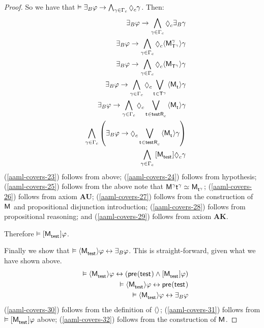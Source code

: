 \begin{proof}
So we have that $\entails \someactsBs \phi \implies \bigwedge_{\gamma \in \Gamma_\agentC} \possibleC \gamma$.
Then:
\begin{eqnarray}
    && \someactsBs \phi \implies \bigwedge_{\gamma \in \Gamma_\agentC} \possibleC \someactsBs \gamma \label{aaml-covers-23}\\
    && \someactsBs \phi \implies \bigwedge_{\gamma \in \Gamma_\agentC} \possibleC \actionE{\aPModel[\gamma]{\aStatesT[\gamma]}} \gamma \label{aaml-covers-24}\\
    && \someactsBs \phi \implies \bigwedge_{\gamma \in \Gamma_\agentC} \possibleC \actionE{\aPModel{\aStatesT[\gamma]}} \gamma \label{aaml-covers-25}\\
    && \someactsBs \phi \implies \bigwedge_{\gamma \in \Gamma_\agentC} \possibleC \bigvee_{\aStateT \in \aStatesT[\gamma]} \actionE{\aPModel{\aStateT}} \gamma \label{aaml-covers-26}\\
    && \someactsBs \phi \implies \bigwedge_{\gamma \in \Gamma_\agentC} \possibleC \bigvee_{\aStateT \in \aSuccessorsC{\aStateTest}} \actionE{\aPModel{\aStateT}} \gamma \label{aaml-covers-27}\\
    && \bigwedge_{\gamma \in \Gamma_\agentC} \left(\someactsBs \phi \implies \possibleC \bigvee_{\aStateT \in \aSuccessorsC{\aStateTest}} \actionE{\aPModel{\aStateT}} \gamma\right) \label{aaml-covers-28}\\
    && \bigwedge_{\gamma \in \Gamma_\agentC} \actionA{\aPModel{\aStateTest}} \possibleC \gamma \label{aaml-covers-29}
\end{eqnarray}
(\ref{aaml-covers-23}) follows from above;
(\ref{aaml-covers-24}) follows from hypothesis;
(\ref{aaml-covers-25}) follows from the above note that $\aModel[\gamma]{\aStateT[\gamma]} \bisimilar \aPModel{\aStateT[\gamma]}$;
(\ref{aaml-covers-26}) follows from \axiomAamlK{} axiom {\bf AU};
(\ref{aaml-covers-27}) follows from the construction of $\aModel$ and propositional disjunction introduction;
(\ref{aaml-covers-28}) follows from propositional reasoning; and
(\ref{aaml-covers-29}) follows from \axiomAamlK{} axiom {\bf AK}.

Therefore $\entails \actionA{\aPModel{\aStateTest}} \phi$.

Finally we show that $\entails \actionE{\aPModel{\aStateTest}} \phi \iff \someactsBs \phi$. 
This is straight-forward, given what we have shown above.
\begin{eqnarray}
    && \entails \actionE{\aPModel{\aStateTest}} \phi \iff (\aPrecondition(\aStateTest) \land \actionA{\aPModel{\aStateTest}} \phi) \label{aaml-covers-30}\\
    && \entails \actionE{\aPModel{\aStateTest}} \phi \iff \aPrecondition(\aStateTest) \label{aaml-covers-31}\\
    && \entails \actionE{\aPModel{\aStateTest}} \phi \iff \someactsBs \phi \label{aaml-covers-32}
\end{eqnarray}
(\ref{aaml-covers-30}) follows from the definition of ${\langle {} \rangle}$;
(\ref{aaml-covers-31}) follows from $\entails \actionA{\aPModel{\aStateTest}} \phi$ above;
(\ref{aaml-covers-32}) follows from the construction of $\aModel$.
\end{proof}

